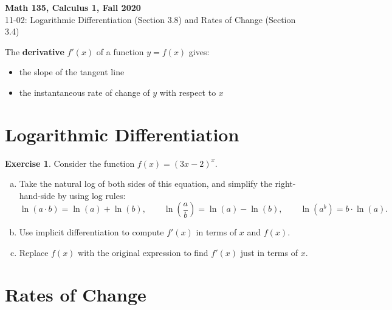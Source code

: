 \documentclass[11pt,reqno,final]{amsart}
\numberwithin{figure}{section}
\theoremstyle{definition} %
\newtheorem{exercise}[question]{Exercise}
\begin{document}
\begin{center}
        \textbf{\Large Math 135, Calculus 1, Fall 2020}\\[10pt]
        {\large 11-02: Logarithmic Differentiation (Section 3.8) and Rates of Change (Section 3.4)}
\end{center}

\thispagestyle{empty}


\renewcommand{\thesection}{\Alph{section}}


The \textbf{derivative} $f'(x)$ of a function $y=f(x)$ gives:
\begin{itemize}
\item the slope of the tangent line
\item the instantaneous rate of change of $y$ with respect to $x$
\end{itemize}


\section{Logarithmic Differentiation}

\begin{exercise}
        Consider the function $f(x) = (3x-2)^x$.
        \begin{enumerate}[(a)]
        \item Take the natural log of both sides of this equation, and simplify the right-hand-side by using log rules:
                \[
                        \ln(a \cdot b) = \ln(a) + \ln(b),
                        \qquad
                        \ln\left( \frac{a}{b} \right) = \ln(a) - \ln(b),
                        \qquad
                        \ln\left(a^b\right) = b \cdot \ln(a).
                \]
                \vfill
        \item Use implicit differentiation to compute $f'(x)$ in terms of $x$ and $f(x)$.
                \vfill
        \item Replace $f(x)$ with the original expression to find $f'(x)$ just in terms of $x$.
                \vfill
        \end{enumerate}
\end{exercise}

\newpage

\section{Rates of Change}
\end{document}
